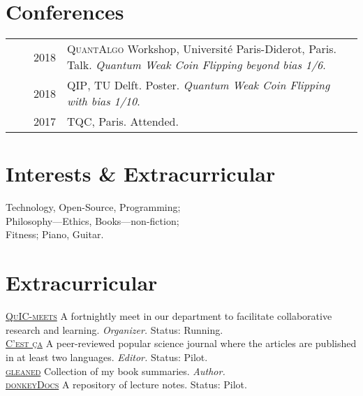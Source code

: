 \documentclass[a4paper,10pt]{article}
\begin{document}
\section{Conferences}
\begin{tabular}{rrp{11cm}}
  & ~~2018 &\textsc{QuantAlgo} Workshop, Université Paris-Diderot, Paris. Talk. \emph{Quantum Weak Coin Flipping beyond bias 1/6}. \\  
  & ~~2018 &\textsc{QIP}, TU Delft. Poster. \emph{Quantum Weak Coin Flipping with bias 1/10}. \\
  & ~~2017 &\textsc{TQC}, Paris. Attended.
  \end{tabular}


\section{Interests \& Extracurricular}
Technology, Open-Source, Programming;\\ 
Philosophy---Ethics, Books---non-fiction; \\
Fitness; Piano, Guitar. \\

\section{Extracurricular}
\textsc{\hyperlink{quic-meets.github.io}{QuIC-meets}} A fortnightly meet in our department to facilitate collaborative research and learning. \emph{Organizer.} Status: Running. \\
\textsc{\hyperlink{c-est-ca.github.io}{C'est ça}} A peer-reviewed popular science journal where the articles are published in at least two languages. \emph{Editor.} Status: Pilot. \\
\textsc{\hyperlink{gleaned.github.io}{gleaned}} Collection of my book summaries. \emph{Author.} \\
\textsc{\hyperlink{donkey-docs.github.io}{donkeyDocs}} A repository of lecture notes. Status: Pilot. \\
\end{document}
